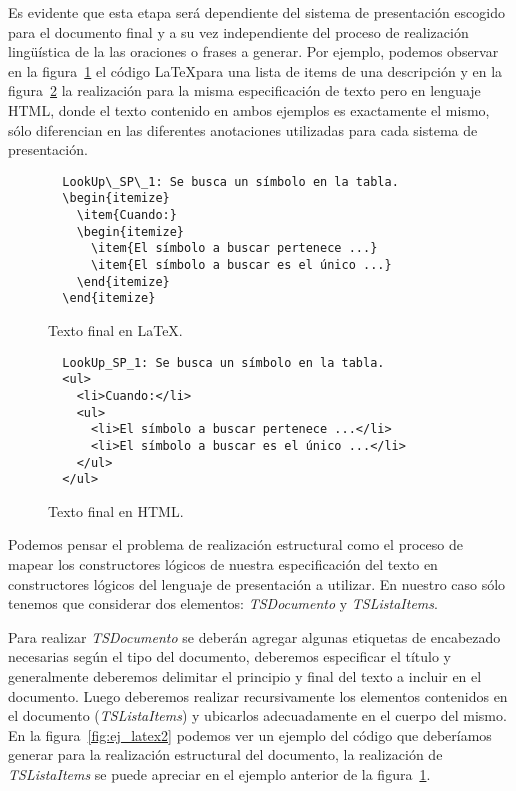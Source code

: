 Es evidente que esta etapa será dependiente del sistema de presentación escogido para el documento final y a su vez independiente del proceso de realización lingüística de la las oraciones o frases a generar.  Por ejemplo, podemos observar en la figura~\ref{fig:ej_latex} el código \LaTeX para una lista de items de una descripción y en la figura~\ref{fig:ej_html} la realización para la misma especificación de texto pero en lenguaje HTML, donde el texto contenido en ambos ejemplos es exactamente el mismo, sólo diferencian en las diferentes anotaciones utilizadas para cada sistema de presentación.

\begin{figure}[H]
  \begin{verbatim}
  LookUp\_SP\_1: Se busca un símbolo en la tabla.  
  \begin{itemize}
    \item{Cuando:}
    \begin{itemize}
      \item{El símbolo a buscar pertenece ...}
      \item{El símbolo a buscar es el único ...}   
    \end{itemize}
  \end{itemize}
  \end{verbatim}
  \caption{Texto final en \LaTeX.}
  \label{fig:ej_latex}
\end{figure}

\begin{figure}[H]
  \begin{verbatim}
  LookUp_SP_1: Se busca un símbolo en la tabla.  
  <ul>
    <li>Cuando:</li>
    <ul>
      <li>El símbolo a buscar pertenece ...</li>
      <li>El símbolo a buscar es el único ...</li>
    </ul>
  </ul>
  \end{verbatim}
  \caption{Texto final en HTML.}
  \label{fig:ej_html}
\end{figure}

Podemos pensar el problema de realización estructural como el proceso de mapear los constructores lógicos de nuestra especificación del texto en constructores lógicos del lenguaje de presentación a utilizar. En nuestro caso sólo tenemos que considerar dos elementos: \emph{TSDocumento} y \emph{TSListaItems}.

Para realizar \emph{TSDocumento} se deberán agregar algunas etiquetas de encabezado necesarias según el tipo del documento, deberemos especificar el título y generalmente deberemos delimitar el principio y final del texto a incluir en el documento. Luego deberemos realizar recursivamente los elementos contenidos en el documento (\emph{TSListaItems}) y ubicarlos adecuadamente en el cuerpo del mismo. En la figura~\ref{fig:ej_latex2} podemos ver un ejemplo del código que deberíamos generar para la realización estructural del documento, la realización de \emph{TSListaItems} se puede apreciar en el ejemplo anterior de la figura~\ref{fig:ej_latex}.

